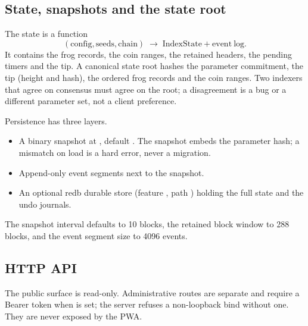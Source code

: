 \subsection{State, snapshots and the state root}

The state is a function
\begin{equation}
(\mathrm{config},\mathrm{seeds},\mathrm{chain})\;\longrightarrow\;
\mathrm{IndexState}+\mathrm{event\ log}.
\end{equation}
It contains the frog records, the coin ranges, the retained headers, the
pending timers and the tip. A canonical state root hashes the parameter
commitment, the tip (height and hash), the ordered frog records and the coin
ranges. Two indexers that agree on consensus must agree on the root; a
disagreement is a bug or a different parameter set, not a client preference.

Persistence has three layers.

\begin{itemize}[leftmargin=1.4em,itemsep=0.3em]
  \item A binary snapshot at , default
        . The snapshot embeds the parameter
        hash; a mismatch on load is a hard error, never a migration.
  \item Append-only event segments next to the snapshot.
  \item An optional redb durable store (feature , path
        ) holding the full state and the undo journals.
\end{itemize}

The snapshot interval defaults to 10 blocks, the retained block window to
288 blocks, and the event segment size to 4096 events.

\subsection{HTTP API}

The public surface is read-only. Administrative routes are separate and
require a Bearer token when  is set; the server
refuses a non-loopback bind without one. They are never exposed by the PWA.

